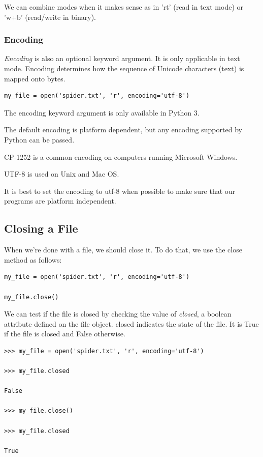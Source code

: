 \documentclass{article}
\begin{document}
We can combine modes when it makes sense as in 'rt' (read in text mode) or 'w+b' (read/write in binary).

\subsubsection{Encoding}
\textit{Encoding} is also an optional keyword argument.  It is only applicable in text mode.  Encoding determines how the sequence of Unicode characters (text) is mapped onto bytes.  

\begin{lstlisting}
my_file = open('spider.txt', 'r', encoding='utf-8')
\end{lstlisting}

The encoding keyword argument is only available in Python 3.

The default encoding is platform dependent, but any encoding supported by Python can be passed.  

CP-1252 is a common encoding on computers running Microsoft Windows.

UTF-8 is used on Unix and Mac OS.

It is best to set the encoding to utf-8  when possible to make sure that our programs are platform independent.

\subsection{Closing a File}

When we're done with a file, we should close it.  To do that, we use the close method as follows:

\begin{lstlisting}
my_file = open('spider.txt', 'r', encoding='utf-8')

my_file.close()
\end{lstlisting}

We can test if the file is closed by checking the value of \textit{closed},   a boolean attribute defined on the file object.    closed indicates the state of the file.  It is True if the file is closed and False otherwise.

\begin{lstlisting}
>>> my_file = open('spider.txt', 'r', encoding='utf-8')

>>> my_file.closed

False

>>> my_file.close()

>>> my_file.closed

True
\end{lstlisting}
\end{document}
